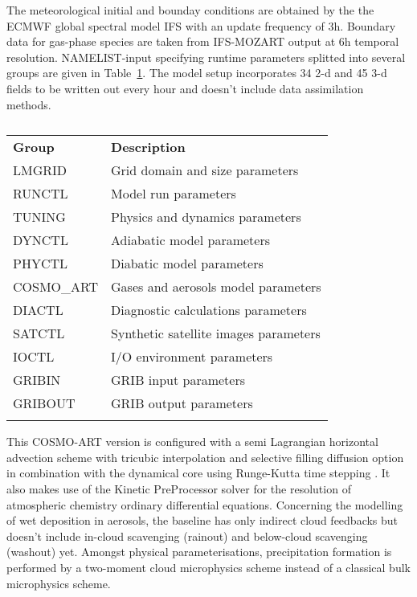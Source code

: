 The meteorological initial and  bounday conditions are obtained by the
the ECMWF  global spectral model IFS  with an update  frequency of 3h.
Boundary data  for gas-phase species are taken  from IFS-MOZART output
at   6h  temporal   resolution.   NAMELIST-input   specifying  runtime
parameters    splitted   into    several   groups    are    given   in
Table~\ref{tab:1}.   The model setup  incorporates 34  2-d and  45 3-d
fields  to  be  written  out  every  hour  and  doesn't  include  data
assimilation methods.

\begin{table}[htbf]
  \begin{center}
    \caption{}
    \label{tab:1}
    \begin{tabular}{ll}
      \hline\noalign{\smallskip} 
      \textbf{Group} & \textbf{Description} \\
      \noalign{\smallskip}\hline\noalign{\smallskip}
      LMGRID & Grid domain and size parameters \\
      RUNCTL & Model run parameters \\
      TUNING & Physics and dynamics parameters \\
      DYNCTL & Adiabatic model parameters \\
      PHYCTL & Diabatic model parameters \\
      COSMO\_ART & Gases and aerosols model parameters \\
      DIACTL & Diagnostic calculations parameters \\
      SATCTL & Synthetic satellite images parameters \\
      IOCTL & I/O environment parameters \\
      GRIBIN & GRIB input parameters \\
      GRIBOUT & GRIB output parameters \\
     \noalign{\smallskip}\hline
    \end{tabular}
  \end{center}
\end{table}

This COSMO-ART version is configured with a semi Lagrangian horizontal
advection  scheme with  tricubic interpolation  and  selective filling
diffusion  option  in  combination   with  the  dynamical  core  using
Runge-Kutta time stepping \citep{}.  It  also makes use of the Kinetic
PreProcessor  solver  \citep{}   for  the  resolution  of  atmospheric
chemistry ordinary  differential equations.  Concerning  the modelling
of wet  deposition in aerosols,  the baseline has only  indirect cloud
feedbacks  but  doesn't  include  in-cloud  scavenging  (rainout)  and
below-cloud    scavenging    (washout)    yet.     Amongst    physical
parameterisations,   precipitation  formation   is   performed  by   a
two-moment  cloud  microphysics scheme  instead  of  a classical  bulk
microphysics scheme.
